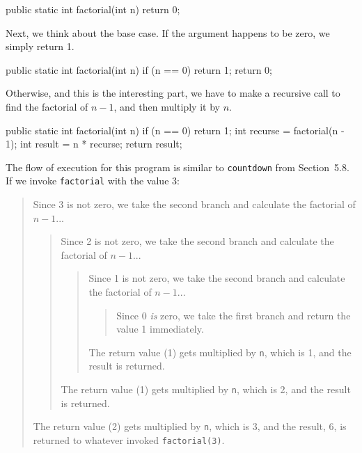\documentclass[12pt]{book}
\theoremstyle{exercise}
\newcommand{\java}[1]{\verb"#1"}
\newcommand{\java}[1]{\lstinline{#1}} %
\begin{document}
\begin{code}
    public static int factorial(int n) {
        return 0;
    }
\end{code}

Next, we think about the base case.
If the argument happens to be zero, we simply return 1.

\begin{code}
    public static int factorial(int n) {
        if (n == 0) {
            return 1;
        }
        return 0;
    }
\end{code}

Otherwise, and this is the interesting part, we have to make a recursive call to find the factorial of $n-1$, and then multiply it by $n$.

\begin{code}
    public static int factorial(int n) {
        if (n == 0) {
            return 1;
        }
        int recurse = factorial(n - 1);
        int result = n * recurse;
        return result;
    }
\end{code}

The flow of execution for this program is similar to \java{countdown} from Section~5.8.
If we invoke \java{factorial} with the value 3:

\vspace{-1ex}
\begin{quote}
Since 3 is not zero, we take the second branch and calculate the factorial of $n-1$...
\begin{quote}
Since 2 is not zero, we take the second branch and calculate the factorial of $n-1$...
\begin{quote}
Since 1 is not zero, we take the second branch and calculate the factorial of $n-1$...
\begin{quote}
Since 0 {\em is} zero, we take the first branch and return the value 1 immediately.
\end{quote}
The return value (1) gets multiplied by \java{n}, which is 1, and the result is returned.
\end{quote}
The return value (1) gets multiplied by \java{n}, which is 2, and the result is returned.
\end{quote}
The return value (2) gets multiplied by \java{n}, which is 3, and the result, 6, is returned to whatever invoked \java{factorial(3)}.
\end{quote}
\vspace{-1ex}

\end{document}
